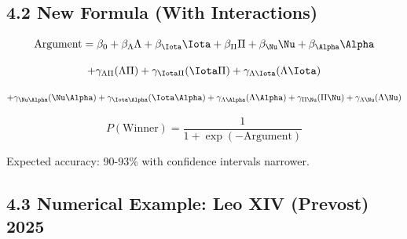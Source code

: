 \documentclass[11pt]{article}
\begin{document}
\subsection{4.2 New Formula (With Interactions)}

\begin{equation}
\text{Argument} = \beta_0 + \beta_\Lambda \Lambda + \beta_\Iota \Iota + \beta_\Pi \Pi + \beta_\Nu \Nu + \beta_\Alpha \Alpha
\end{equation}

\vspace{-0.3cm}

\begin{equation}
+ \gamma_{\Lambda\Pi}(\Lambda \Pi) + \gamma_{\Iota\Pi}(\Iota \Pi) + \gamma_{\Lambda\Iota}(\Lambda \Iota)
\end{equation}

\vspace{-0.3cm}

\begin{equation}
+ \gamma_{\Nu\Alpha}(\Nu \Alpha) + \gamma_{\Iota\Alpha}(\Iota \Alpha) + \gamma_{\Lambda\Alpha}(\Lambda \Alpha) + \gamma_{\Pi\Nu}(\Pi \Nu) + \gamma_{\Lambda\Nu}(\Lambda \Nu)
\end{equation}

\vspace{-0.3cm}

\begin{equation}
P(\text{Winner}) = \frac{1}{1 + \exp(-\text{Argument})}
\end{equation}

Expected accuracy: 90-93\% with confidence intervals narrower.

\subsection{4.3 Numerical Example: Leo XIV (Prevost) 2025}
\end{document}

